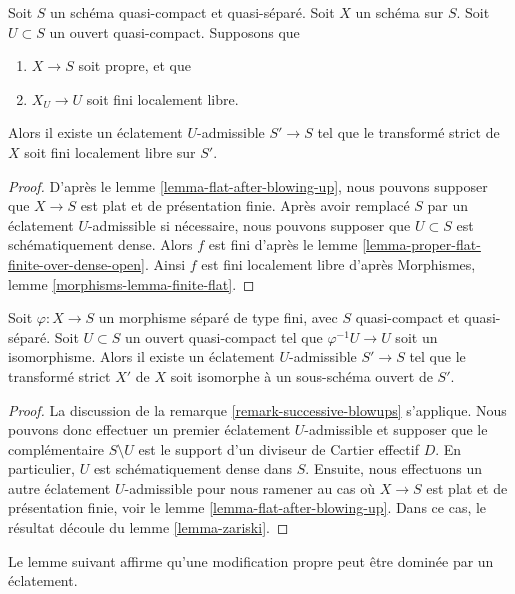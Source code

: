 \begin{lemma}
\label{lemma-finite-after-blowing-up}
Soit $S$ un schéma quasi-compact et quasi-séparé.
Soit $X$ un schéma sur $S$.
Soit $U \subset S$ un ouvert quasi-compact.
Supposons que
\begin{enumerate}
\item $X \to S$ soit propre, et que
\item $X_U \to U$ soit fini localement libre.
\end{enumerate}
Alors il existe un éclatement $U$-admissible $S' \to S$ tel que
le transformé strict de $X$ soit fini localement libre sur $S'$.
\end{lemma}

\begin{proof}
D'après le lemme \ref{lemma-flat-after-blowing-up}, nous pouvons supposer que
$X \to S$ est plat et de présentation finie. Après avoir remplacé
$S$ par un éclatement $U$-admissible si nécessaire, nous pouvons supposer
que $U \subset S$ est schématiquement dense. Alors $f$ est
fini d'après le lemme \ref{lemma-proper-flat-finite-over-dense-open}.
Ainsi $f$ est fini localement libre d'après
Morphismes, lemme \ref{morphisms-lemma-finite-flat}.
\end{proof}

\begin{lemma}
\label{lemma-zariski-after-blowup}
Soit $\varphi : X \to S$ un morphisme séparé de type fini, avec
$S$ quasi-compact et quasi-séparé. Soit $U \subset S$ un
ouvert quasi-compact tel que $\varphi^{-1}U \to U$ soit un isomorphisme.
Alors il existe un éclatement $U$-admissible $S' \to S$ tel que
le transformé strict $X'$ de $X$ soit isomorphe à un sous-schéma ouvert
de $S'$.
\end{lemma}

\begin{proof}
La discussion de la remarque \ref{remark-successive-blowups} s'applique.
Nous pouvons donc effectuer un premier éclatement $U$-admissible et supposer que le complémentaire
$S \setminus U$ est le support d'un diviseur de Cartier effectif $D$.
En particulier, $U$ est schématiquement dense dans $S$.
Ensuite, nous effectuons un autre éclatement $U$-admissible pour nous ramener au cas où
$X \to S$ est plat et de présentation finie, voir
le lemme \ref{lemma-flat-after-blowing-up}.
Dans ce cas, le résultat découle du lemme \ref{lemma-zariski}.
\end{proof}

\noindent
Le lemme suivant affirme qu'une modification propre peut être dominée
par un éclatement.

